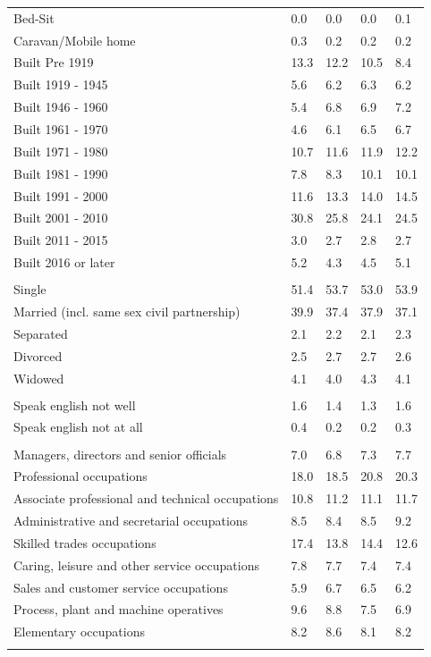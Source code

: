 \documentclass{article}
\begin{document}
\begin{table}[h]
\begin{tabular}{KTTTT}
Bed-Sit & 0.0& 0.0& 0.0& 0.1\\
Caravan/Mobile home & 0.3& 0.2& 0.2& 0.2\\
    \hline
Built Pre 1919 & 13.3& 12.2& 10.5&  8.4\\
Built 1919 - 1945 & 5.6& 6.2& 6.3& 6.2\\
Built  1946 - 1960 & 5.4& 6.8& 6.9& 7.2\\
Built  1961 - 1970 & 4.6& 6.1& 6.5& 6.7\\
Built  1971 - 1980 & 10.7& 11.6& 11.9& 12.2\\
Built  1981 - 1990 &  7.8&  8.3& 10.1& 10.1\\
Built  1991 - 2000 & 11.6& 13.3& 14.0& 14.5\\
Built  2001 - 2010 & 30.8& 25.8& 24.1& 24.5\\
Built  2011 - 2015 & 3.0& 2.7& 2.8& 2.7\\
Built  2016 or later & 5.2& 4.3& 4.5& 5.1\\
\hline
    \\
    \hline
Single & 51.4& 53.7& 53.0& 53.9\\
Married (incl. same sex civil partnership) & 39.9& 37.4& 37.9& 37.1\\
Separated  & 2.1& 2.2& 2.1& 2.3\\
Divorced  & 2.5& 2.7& 2.7& 2.6\\
Widowed & 4.1& 4.0& 4.3& 4.1\\
\hline
    \\ 
    \hline
Speak english not well & 1.6& 1.4& 1.3& 1.6\\
Speak english not at all & 0.4& 0.2& 0.2& 0.3\\
\hline
    \\
    \hline
Managers, directors and senior officials & 7.0& 6.8& 7.3& 7.7\\
Professional occupations & 18.0& 18.5& 20.8& 20.3\\
Associate professional and technical occupations & 10.8& 11.2& 11.1& 11.7\\
Administrative and secretarial occupations & 8.5& 8.4& 8.5& 9.2\\
Skilled trades occupations & 17.4& 13.8& 14.4& 12.6\\
Caring, leisure and other service occupations & 7.8& 7.7& 7.4& 7.4\\
Sales and customer service occupations & 5.9& 6.7& 6.5& 6.2\\
Process, plant and machine operatives & 9.6& 8.8& 7.5& 6.9\\
Elementary occupations & 8.2& 8.6& 8.1& 8.2\\
\hline
\end{tabular}
\end{table}
\end{document}
